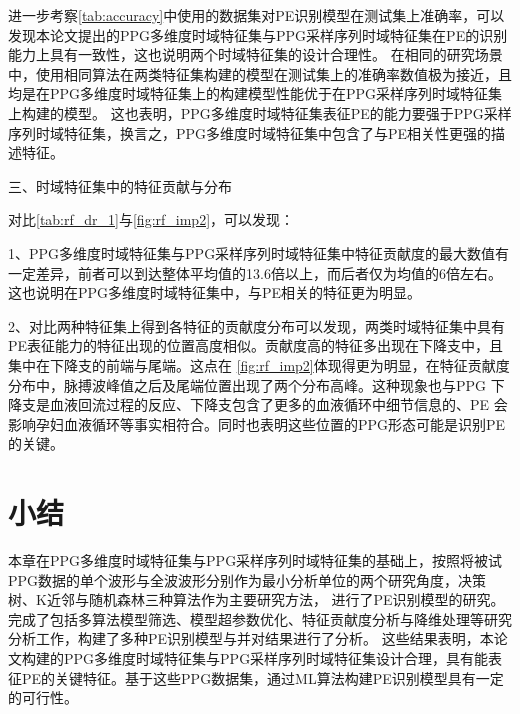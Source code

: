 进一步考察\autoref{tab:accuracy}中使用的数据集对PE识别模型在测试集上准确率，可以发现本论文提出的PPG多维度时域特征集与PPG采样序列时域特征集在PE的识别能力上具有一致性，这也说明两个时域特征集的设计合理性。
在相同的研究场景中，使用相同算法在两类特征集构建的模型在测试集上的准确率数值极为接近，且均是在PPG多维度时域特征集上的构建模型性能优于在PPG采样序列时域特征集上构建的模型。
这也表明，PPG多维度时域特征集表征PE的能力要强于PPG采样序列时域特征集，换言之，PPG多维度时域特征集中包含了与PE相关性更强的描述特征。

三、时域特征集中的特征贡献与分布

对比\autoref{tab:rf_dr_1}与\autoref{fig:rf_imp2}，可以发现：

1、PPG多维度时域特征集与PPG采样序列时域特征集中特征贡献度的最大数值有一定差异，前者可以到达整体平均值的13.6倍以上，而后者仅为均值的6倍左右。这也说明在PPG多维度时域特征集中，与PE相关的特征更为明显。

2、对比两种特征集上得到各特征的贡献度分布可以发现，两类时域特征集中具有PE表征能力的特征出现的位置高度相似。贡献度高的特征多出现在下降支中，且集中在下降支的前端与尾端。这点在
\autoref{fig:rf_imp2}体现得更为明显，在特征贡献度分布中，脉搏波峰值之后及尾端位置出现了两个分布高峰。这种现象也与PPG
下降支是血液回流过程的反应、下降支包含了更多的血液循环中细节信息的、PE
会影响孕妇血液循环等事实相符合。同时也表明这些位置的PPG形态可能是识别PE的关键。

\section{小结}
本章在PPG多维度时域特征集与PPG采样序列时域特征集的基础上，按照将被试PPG数据的单个波形与全波波形分别作为最小分析单位的两个研究角度，决策树、K近邻与随机森林三种算法作为主要研究方法，
进行了PE识别模型的研究。
完成了包括多算法模型筛选、模型超参数优化、特征贡献度分析与降维处理等研究分析工作，构建了多种PE识别模型与并对结果进行了分析。
这些结果表明，本论文构建的PPG多维度时域特征集与PPG采样序列时域特征集设计合理，具有能表征PE的关键特征。基于这些PPG数据集，通过ML算法构建PE识别模型具有一定的可行性。